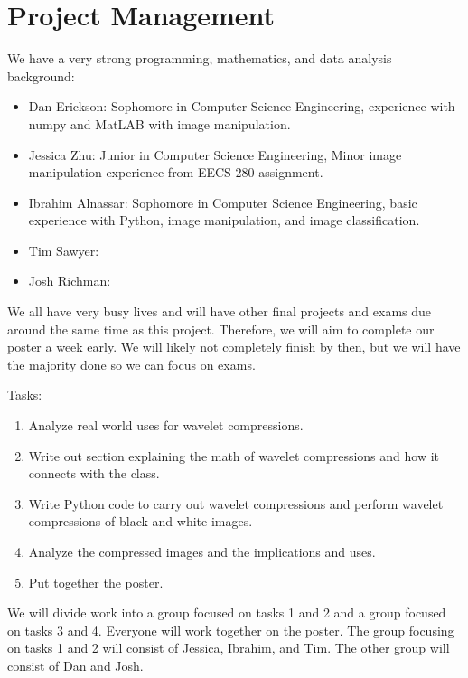 \documentclass[12pt]{article}
\begin{document}
\section{Project Management}

We have a very strong programming, mathematics, and data analysis background:

\begin{itemize}
	\item Dan Erickson: Sophomore in Computer Science Engineering, experience with numpy and MatLAB with image manipulation.
	\item Jessica Zhu: Junior in Computer Science Engineering, Minor image manipulation experience from EECS 280 assignment. 
	\item Ibrahim Alnassar: Sophomore in Computer Science Engineering, basic experience with Python, image manipulation, and image classification.
	\item Tim Sawyer:
	\item Josh Richman:
\end{itemize}

We all have very busy lives and will have other final projects and exams due around the same time as this project. Therefore, we will aim to complete our poster a week early. We will likely not completely finish by then, but we will have the majority done so we can focus on exams.

Tasks:
\begin{enumerate}
	\item Analyze real world uses for wavelet compressions.
	\item Write out section explaining the math of wavelet compressions and how it connects with the class.
	\item Write Python code to carry out wavelet compressions and perform wavelet compressions of black and white images.
	\item Analyze the compressed images and the implications and uses.
	\item Put together the poster.
\end{enumerate}

We will divide work into a group focused on tasks 1 and 2 and a group focused on tasks 3 and 4. Everyone will work together on the poster. The group focusing on tasks 1 and 2 will consist of Jessica, Ibrahim, and Tim. The other group will consist of Dan and Josh.
\end{document}
